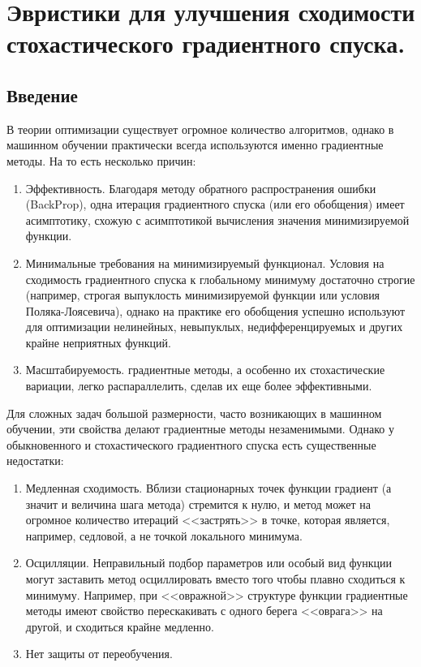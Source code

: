 \section{Эвристики для улучшения сходимости стохастического градиентного спуска.}

\subsection{Введение}
В теории оптимизации существует огромное количество алгоритмов, однако в машинном обучении практически всегда используются именно градиентные методы. На то есть несколько причин:

\begin{enumerate}
    \item Эффективность. Благодаря методу обратного распространения ошибки (BackProp), одна итерация градиентного спуска (или его обобщения) имеет асимптотику, схожую с асимптотикой вычисления значения минимизируемой функции.
    \item Минимальные требования на минимизируемый функционал. Условия на сходимость градиентного спуска к глобальному минимуму достаточно строгие (например, строгая выпуклость минимизируемой функции или условия Поляка-Лоясевича), однако на практике его обобщения успешно используют для оптимизации нелинейных, невыпуклых, недифференцируемых и других крайне неприятных функций.
    \item Масштабируемость. градиентные методы, а особенно их стохастические вариации, легко распараллелить, сделав их еще более эффективными.
\end{enumerate}

Для сложных задач большой размерности, часто возникающих в машинном обучении, эти свойства делают градиентные методы незаменимыми. Однако у обыкновенного и стохастического градиентного спуска есть существенные недостатки:

\begin{enumerate}
    \item Медленная сходимость. Вблизи стационарных точек функции градиент (а значит и величина шага метода) стремится к нулю, и метод может на огромное количество итераций <<застрять>> в точке, которая является, например, седловой, а не точкой локального минимума.
    \item Осцилляции. Неправильный подбор параметров или особый вид функции могут заставить метод осциллировать вместо того чтобы плавно сходиться к минимуму. Например, при <<овражной>> структуре функции градиентные методы имеют свойство перескакивать с одного берега <<оврага>> на другой, и сходиться крайне медленно.
    \item Нет защиты от переобучения.
\end{enumerate}

